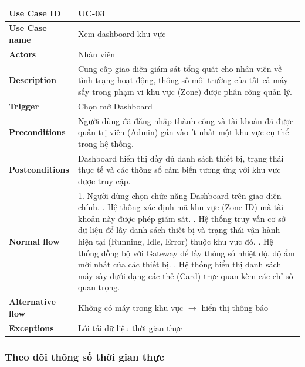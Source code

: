 \begin{tabular}{|p{3.5cm}|p{9.5cm}|}
\hline
\textbf{Use Case ID} & UC-03 \\
\hline
\textbf{Use Case name} & Xem dashboard khu vực \\
\hline
\textbf{Actors} & Nhân viên \\
\hline
\textbf{Description} & 
Cung cấp giao diện giám sát tổng quát cho nhân viên về tình trạng hoạt động, thông số môi trường của tất cả máy sấy trong phạm vi khu vực (Zone) được phân công quản lý. \\
\hline
\textbf{Trigger} & Chọn mở Dashboard \\
\hline
\textbf{Preconditions} & Người dùng đã đăng nhập thành công và tài khoản đã được quản trị viên (Admin) gán vào ít nhất một khu vực cụ thể trong hệ thống. \\
\hline
\textbf{Postconditions} & Dashboard hiển thị đầy đủ danh sách thiết bị, trạng thái thực tế và các thông số cảm biến tương ứng với khu vực được truy cập. \\
\hline
\textbf{Normal flow} & 
1. Người dùng chọn chức năng Dashboard trên giao diện chính. \newline
2. Hệ thống xác định mã khu vực (Zone ID) mà tài khoản này được phép giám sát. \newline 
3. Hệ thống truy vấn cơ sở dữ liệu để lấy danh sách thiết bị và trạng thái vận hành hiện tại (Running, Idle, Error) thuộc khu vực đó. \newline
4. Hệ thống đồng bộ với Gateway để lấy thông số nhiệt độ, độ ẩm mới nhất của các thiết bị. \newline 
5. Hệ thống hiển thị danh sách máy sấy dưới dạng các thẻ (Card) trực quan kèm các chỉ số quan trọng. \\
\hline
\textbf{Alternative flow} & 
Không có máy trong khu vực $\rightarrow$ hiển thị thông báo \\
\hline
\textbf{Exceptions} & Lỗi tải dữ liệu thời gian thực \\
\hline
\end{tabular}


\subsubsection{Theo dõi thông số thời gian thực}

